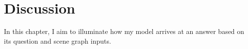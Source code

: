 \chapter{Discussion}
\label{chapter:discussion}

In this chapter, I aim to illuminate how my model arrives at an answer based on its question and scene graph inputs.